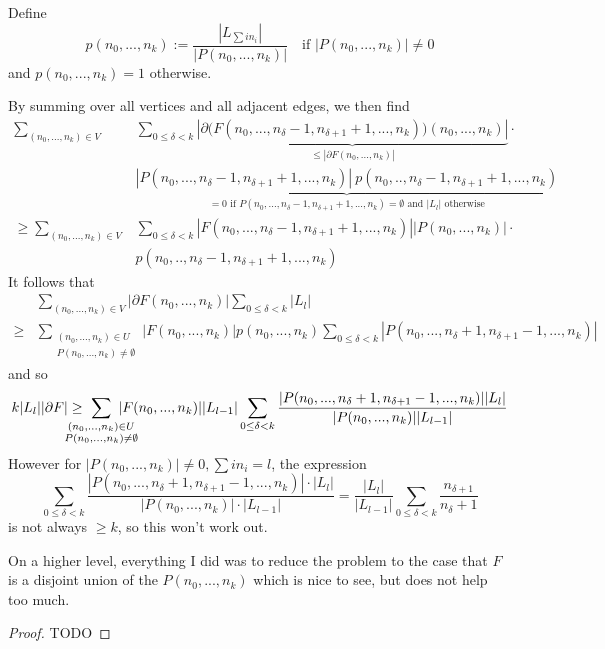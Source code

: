 \documentclass{scrartcl}
\theoremstyle{definition}
\begin{document}
Define
\begin{equation*}
    p(n_0, ..., n_k) := \frac {|L_{\sum in_i}|} {|P(n_0, ..., n_k)|} \quad \text{if $|P(n_0, ..., n_k)| \neq 0$}
\end{equation*}
and $p(n_0, ..., n_k) = 1$ otherwise.

By summing over all vertices and all adjacent edges, we then find
\begin{align*}
    \sum_{(n_0, ..., n_k) \in V}& \sum_{0 \leq \delta < k} \underbrace{|\partial \bigl(F(n_0, ..., n_\delta - 1, n_{\delta + 1} + 1, ..., n_k)\bigr)(n_0, ..., n_k)|}_{\leq |\partial F(n_0, ..., n_k)|} \cdot \\
    &\underbrace{|P(n_0, ..., n_\delta - 1, n_{\delta + 1} + 1, ..., n_k)| \ p(n_0, .., n_\delta - 1, n_{\delta + 1} + 1, ..., n_k)}_{\text{$= 0$ if $P(n_0, ..., n_\delta - 1, n_{\delta + 1} + 1, ..., n_k) = \emptyset$ and $|L_l|$ otherwise}} \\
    \geq \sum_{(n_0, ..., n_k) \in V}& \sum_{0 \leq \delta < k} {|F(n_0, ..., n_\delta - 1, n_{\delta + 1} + 1, ..., n_k)|} {|P(n_0, ..., n_k)|} \cdot \\
    &p(n_0, .., n_\delta - 1, n_{\delta + 1} + 1, ..., n_k)
\end{align*}
It follows that
\begin{align*}
    &\sum_{(n_0, ..., n_k) \in V} {|\partial F(n_0, ..., n_k)|} \sum_{0 \leq \delta < k} {|L_l|} \\
    \geq& \sum_{\substack{(n_0, ..., n_k) \in U\\P(n_0, ..., n_k) \neq \emptyset}} {|F(n_0, ..., n_k)|} p(n_0, ..., n_k) \sum_{0 \leq \delta < k} {|P(n_0, ..., n_\delta + 1, n_{\delta + 1} - 1, ..., n_k)|}
\end{align*}
and so
\begin{align*}
    k |L_l| |\partial F| \geq \ \sum_{\mathclap{\substack{(n_0, ..., n_k) \in U\\P(n_0, ..., n_k) \neq \emptyset}}} \ |F(n_0, ..., n_k)| |L_{l - 1}| \sum_{0 \leq \delta < k} \frac {|P(n_0, ..., n_\delta + 1, n_{\delta + 1} - 1, ..., n_k)| |L_l|} {|P(n_0, ..., n_k)| |L_{l - 1}|}
\end{align*}
However for $|P(n_0, ..., n_k)| \neq 0, \sum i n_i = l$, the expression
\begin{equation*}
    \sum_{0 \leq \delta < k} \frac {|P(n_0, ..., n_\delta + 1, n_{\delta + 1} - 1, ..., n_k)| \cdot |L_l|} {|P(n_0, ..., n_k)| \cdot |L_{l - 1}|} = \frac {|L_l|} {|L_{l - 1}|} \sum_{0 \leq \delta < k} \frac {n_{\delta + 1}} {n_\delta + 1}
\end{equation*}
is not always $\geq k$, so this won't work out.

On a higher level, everything I did was to reduce the problem to the case that $F$ is a disjoint union of the $P(n_0, ..., n_k)$ which is nice to see, but does not help too much.
\begin{proof}
    TODO
\end{proof}
\end{document}
